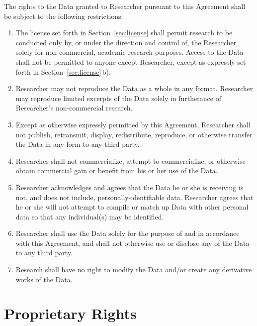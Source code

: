 \documentclass[11pt]{article}
\begin{document}
\begin{Form}
  The rights to the Data granted to Researcher pursuant to this Agreement shall be subject to the following restrictions:

  \begin{enumerate}[label=\alph*)]
    \item The license set forth in Section~\ref{sec:license} shall permit research to be conducted only by, or under the direction and control of, the Researcher solely for non-commercial, academic research purposes. 
    Access to the Data shall not be permitted to anyone except Researcher, except as expressly set forth in Section~\ref{sec:license}\,b).
    \item Researcher may not reproduce the Data as a whole in any format.  
      Researcher may reproduce limited excerpts of the Data solely in furtherance of Researcher's non-commercial research.
    \item Except as otherwise expressly permitted by this Agreement, Researcher shall not publish, retransmit, display, redistribute, reproduce, or otherwise transfer the Data in any form to any third party.
    \item Researcher shall not commercialize, attempt to commercialize, or otherwise obtain commercial gain or benefit from his or her use of the Data.
    \item Researcher acknowledges and agrees that the Data he or she is receiving is not, and does not include, personally-identifiable data.
     Researcher agrees that he or she will not attempt to compile or match up Data with other personal data so that any individual(s) may be identified.
    \item Researcher shall use the Data solely for the purpose of and in accordance with this Agreement, and shall not otherwise use or disclose any of the Data to any third party.  
    \item Research shall have no right to modify the Data and/or create any derivative works of the Data.
  \end{enumerate}

  
  \section{Proprietary Rights}
  \label{sec:rights}


\end{Form}
\end{document}
